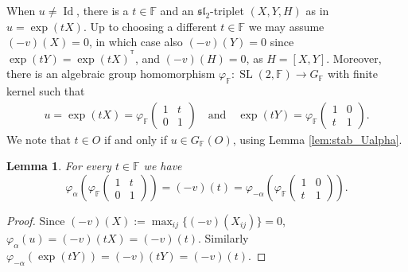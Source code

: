 \documentclass[12pt]{amsart}
\newcommand{\F}{\mathbb{F} }
\newcommand{\Id}{\operatorname{Id} }
\newcommand{\tran}{{^{\mathsf{T}}\!}}
\numberwithin{equation}{section}
\newtheorem{lemma}[theorem]{Lemma}
\theoremstyle{remark} %
\begin{document}
When $u\neq \Id $, there is a $t \in \F$ and an $\mathfrak{sl}_2$-triplet $(X,Y,H)$ as in \cite[Proposition \ref{I-prop:Jacobson_Morozov_real_closed}]{AppAGRCF} $u = \exp(tX)$. Up to choosing a different $t\in \F$ we may assume $(-v)(X)=0$, in which case also $(-v)(Y)=0$ since $\exp(tY) = \exp(tX)^\tran$, and $(-v)(H)=0$, as $H=[X,Y]$. Moreover, there is an algebraic group homomorphism $\varphi_\F \colon \operatorname{SL}(2,\F) \to G_\F$ with finite kernel such that
\begin{align*}
	u = \exp(tX) = \varphi_\F \begin{pmatrix}
		1 & t \\ 0& 1
	\end{pmatrix}   \quad \text{and} \quad \exp(tY) = \varphi_\F \begin{pmatrix}
		1 & 0 \\ t & 1
	\end{pmatrix}.
\end{align*}
We note that $t \in O$ if and only if $u \in G_\F(O)$, using Lemma \ref{lem:stab_Ualpha}.
\begin{lemma}\label{lem:BTphiu_is_vt}
	For every $t\in \F$ we have
	$$
	\varphi_\alpha \left( \varphi_\F \begin{pmatrix}
		1 & t \\ 0 & 1
	\end{pmatrix} \right) = (-v)(t) = \varphi_{-\alpha} \left( \varphi_\F \begin{pmatrix}
		1 & 0 \\ t & 1
	\end{pmatrix} \right) .
	$$
\end{lemma}
\begin{proof}
	Since $(-v)(X) := \max_{ij}\{(-v)(X_{ij})\} = 0$, $\varphi_\alpha(u) = (-v)(tX) = (-v)(t)$. Similarly $\varphi_{-\alpha}(\exp(tY)) = (-v)(tY) = (-v)(t)$.
\end{proof}
\end{document}
